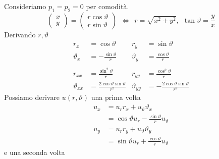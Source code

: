 \documentclass[10pt,a4paper,twoside,openright]{book}
\begin{document}
Consideriamo $p_{1} =p_{2} =0$ per comodità.
\begin{equation*}
    \begin{pmatrix}
        x \\
        y
    \end{pmatrix} =
    \begin{pmatrix}
        r\cos \vartheta \\
        r\sin \vartheta
    \end{pmatrix} \ \ \Leftrightarrow \ \ r=\sqrt{x^{2} +y^{2}},\ \ \tan \vartheta =\frac{y}{x}
\end{equation*}
Derivando $r,\vartheta $
\begin{align*}
    r_{x}           & =\cos \vartheta                                & r_{y}           & =\sin \vartheta                                 \\
    \vartheta _{x}  & =-\frac{\sin \vartheta }{r}                    & \vartheta _{y}  & =\frac{\cos \vartheta }{r}                      \\
                    &                                                &                 &                                                 \\
    r_{xx}          & =\frac{\sin^{2} \vartheta }{r}                 & r_{yy}          & =\frac{\cos^{2} \vartheta }{r}                  \\
    \vartheta _{xx} & =\frac{2\cos \vartheta \sin \vartheta }{r^{2}} & \vartheta _{yy} & =-\frac{2\cos \vartheta \sin \vartheta }{r^{2}}
\end{align*}
Possiamo derivare $u(r,\vartheta)$ una prima volta
\begin{equation*}
    \begin{aligned}
        u_{x} & =u_{r} r_{x} +u_{\vartheta } \vartheta _{x}                     \\
              & =\cos \vartheta u_{r} -\frac{\sin \vartheta }{r} u_{\vartheta } \\
        u_{y} & =u_{r} r_{y} +u_{\vartheta } \vartheta _{y}                     \\
              & =\sin \vartheta u_{r} +\frac{\cos \vartheta }{r} u_{\vartheta }
    \end{aligned}
\end{equation*}
e una seconda volta
\end{document}
